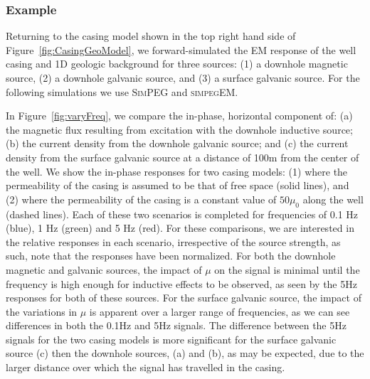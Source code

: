 \documentclass{segabs}
\newcommand{\SimPEG}{\textsc{SimPEG}\xspace}
\newcommand{\simpegEM}{\textsc{simpegEM}\xspace}
\begin{document}
\subsubsection{Example}
Returning to the casing model shown in the top right hand side of Figure~\ref{fig:CasingGeoModel}, we forward-simulated the EM response of the well casing and 1D geologic background for three sources: (1) a downhole magnetic source, (2) a downhole galvanic source, and (3) a surface galvanic source. For the following simulations we use \SimPEG and \simpegEM \citep{SimPEG, SimPEGEM}.

In Figure~\ref{fig:varyFreq}, we compare the in-phase, horizontal component of: (a) the magnetic flux resulting from excitation with the downhole inductive source; (b) the current density from the downhole galvanic source; and (c) the current density from the surface galvanic source at a distance of 100m from the center of the well. We show the in-phase responses for two casing models: (1) where the permeability of the casing is assumed to be that of free space (solid lines), and (2) where the permeability of the casing is a constant value of $50 \mu_0$ along the well (dashed lines). Each of these two scenarios is completed for frequencies of 0.1 Hz (blue), 1 Hz (green) and 5 Hz (red). For these comparisons, we are interested in the relative responses in each scenario, irrespective of the source strength, as such, note that the responses have been normalized. For both the downhole magnetic and galvanic sources, the impact of $\mu$ on the signal is minimal until the frequency is high enough for inductive effects to be observed, as seen by the 5Hz responses for both of these sources. For the surface galvanic source, the impact of the variations in $\mu$ is apparent over a larger range of frequencies, as we can see differences in both the 0.1Hz and 5Hz signals. The difference between the 5Hz signals for the two casing models is more significant for the surface galvanic source (c) then the downhole sources, (a) and (b), as may be expected, due to the larger distance over which the signal has travelled in the casing.
\end{document}
